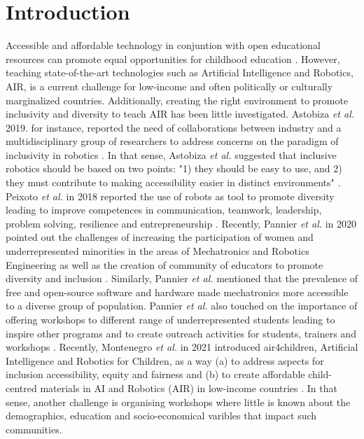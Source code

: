 \documentclass[conference]{IEEEtran}
\newcommand{\etal}{\textit{et al. }} %
\begin{document}
\section{Introduction}
Accessible and affordable technology in conjuntion with open educational resources can promote equal opportunities for childhood education \cite{yoshie2021-unesco}.
However, teaching state-of-the-art technologies such as Artificial Intelligence and Robotics, AIR, is a current challenge for low-income and often politically or culturally marginalized countries.
Additionally, creating the right environment to promote inclusivity and diversity to teach AIR has been little investigated. 
Astobiza \etal 2019. for instance, reported the need of collaborations between industry and a multidisciplinary group of researchers to address concerns on the paradigm of inclusivity in robotics \cite{MonasterioAstobiza2019}.
In that sense, Astobiza \etal suggested that inclusive robotics should be based on two points: "1) they should be easy to use, and 2) they must contribute to making accessibility easier in distinct environments" \cite{MonasterioAstobiza2019}.
Peixoto \etal in 2018 reported the use of robots as tool to promote diversity leading to improve competences in communication, teamwork, leadership, problem solving, resilience and entrepreneurship \cite{PeixotoCastro2018, PeixotoGonzalez2018}. 
Recently, Pannier \etal in 2020 pointed out the challenges of increasing the  participation of women and underrepresented minorities in the areas of Mechatronics and Robotics Engineering as well as the creation of community of educators to promote diversity and inclusion \cite{Pannier2020}.
Similarly, Pannier \etal mentioned that the prevalence of free and open-source software and hardware made mechatronics more accessible to a diverse group of population.
Pannier \etal also touched on the importance of offering workshops to different range of underrepresented students leading to inspire other programs and to create outreach activities for students, trainers and workshops \cite{Pannier2020}.
Recently, Montenegro \etal in 2021 introduced air4children, Artificial Intelligence and Robotics for Children, as a way (a) to address aspects for inclusion accessibility, equity and fairness and (b) to create affordable child-centred materials in AI and Robotics (AIR) in low-income countries \cite{montenegro2021air4children}. 
In that sense, another challenge is organising workshops where little is known about the demographics, education and socio-economical varibles that impact such communities.
\end{document}
